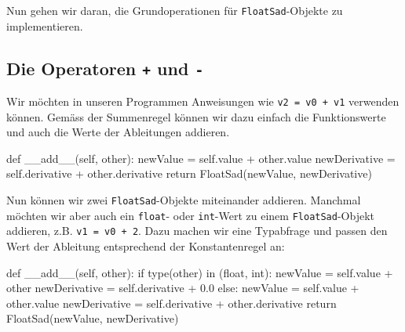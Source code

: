 \documentclass[
  a4paper,
  DIV=11]{scrreprt}
\newenvironment{Shaded}{\begin{snugshade}}{\end{snugshade}}
\newcommand{\BuiltInTok}[1]{\textcolor[rgb]{0.00,0.23,0.31}{#1}}
\newcommand{\ControlFlowTok}[1]{\textcolor[rgb]{0.00,0.23,0.31}{#1}}
\newcommand{\FloatTok}[1]{\textcolor[rgb]{0.68,0.00,0.00}{#1}}
\newcommand{\FunctionTok}[1]{\textcolor[rgb]{0.28,0.35,0.67}{#1}}
\newcommand{\KeywordTok}[1]{\textcolor[rgb]{0.00,0.23,0.31}{#1}}
\newcommand{\NormalTok}[1]{\textcolor[rgb]{0.00,0.23,0.31}{#1}}
\newcommand{\OperatorTok}[1]{\textcolor[rgb]{0.37,0.37,0.37}{#1}}
\newcommand{\VariableTok}[1]{\textcolor[rgb]{0.07,0.07,0.07}{#1}}
\theoremstyle{definition}
\theoremstyle{definition}
\theoremstyle{remark}
\begin{document}
Nun gehen wir daran, die Grundoperationen für \texttt{FloatSad}-Objekte
zu implementieren.

\hypertarget{sec-implementAddSubtract}{%
\subsection{\texorpdfstring{Die Operatoren \texttt{+} und
\texttt{-}}{Die Operatoren + und -}}\label{sec-implementAddSubtract}}

Wir möchten in unseren Programmen Anweisungen wie
\texttt{v2\ =\ v0\ +\ v1} verwenden können. Gemäss der Summenregel
können wir dazu einfach die Funktionswerte und auch die Werte der
Ableitungen addieren.

\begin{Shaded}
\begin{Highlighting}[]
\KeywordTok{def} \FunctionTok{\_\_add\_\_}\NormalTok{(}\VariableTok{self}\NormalTok{, other):}
\NormalTok{        newValue }\OperatorTok{=} \VariableTok{self}\NormalTok{.value }\OperatorTok{+}\NormalTok{ other.value}
\NormalTok{        newDerivative }\OperatorTok{=} \VariableTok{self}\NormalTok{.derivative }\OperatorTok{+}\NormalTok{ other.derivative}
        \ControlFlowTok{return}\NormalTok{ FloatSad(newValue, newDerivative)}
\end{Highlighting}
\end{Shaded}

Nun können wir zwei \texttt{FloatSad}-Objekte miteinander addieren.
Manchmal möchten wir aber auch ein \texttt{float}- oder
\texttt{int}-Wert zu einem \texttt{FloatSad}-Objekt addieren, z.B.
\texttt{v1\ =\ v0\ +\ 2}. Dazu machen wir eine Typabfrage und passen den
Wert der Ableitung entsprechend der Konstantenregel an:

\begin{Shaded}
\begin{Highlighting}[]
\KeywordTok{def} \FunctionTok{\_\_add\_\_}\NormalTok{(}\VariableTok{self}\NormalTok{, other):}
    \ControlFlowTok{if} \BuiltInTok{type}\NormalTok{(other) }\KeywordTok{in}\NormalTok{ (}\BuiltInTok{float}\NormalTok{, }\BuiltInTok{int}\NormalTok{):}
\NormalTok{        newValue }\OperatorTok{=} \VariableTok{self}\NormalTok{.value }\OperatorTok{+}\NormalTok{ other}
\NormalTok{        newDerivative }\OperatorTok{=} \VariableTok{self}\NormalTok{.derivative }\OperatorTok{+} \FloatTok{0.0}
    \ControlFlowTok{else}\NormalTok{:}
\NormalTok{        newValue }\OperatorTok{=} \VariableTok{self}\NormalTok{.value }\OperatorTok{+}\NormalTok{ other.value}
\NormalTok{        newDerivative }\OperatorTok{=} \VariableTok{self}\NormalTok{.derivative }\OperatorTok{+}\NormalTok{ other.derivative}
    \ControlFlowTok{return}\NormalTok{ FloatSad(newValue, newDerivative)}
\end{Highlighting}
\end{Shaded}
\end{document}
